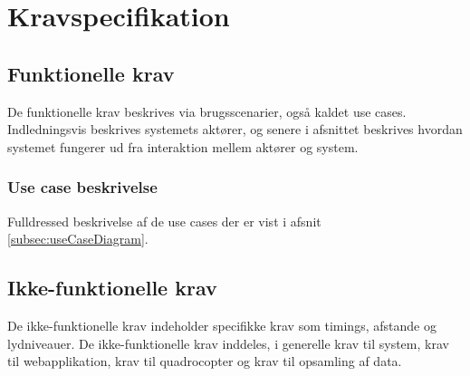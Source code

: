 \chapter{Kravspecifikation}
\label{chap:kravspec}

\section{Funktionelle krav}
\label{sec:funkKrav}
De funktionelle krav beskrives via brugsscenarier, også kaldet use cases. Indledningsvis beskrives systemets aktører, og senere i afsnittet beskrives hvordan systemet fungerer ud fra interaktion mellem aktører og system.

			



\newpage
\subsection{Use case beskrivelse}
\label{subsec:useCaseBeskrivelse}
Fulldressed beskrivelse af de use cases der er vist i afsnit \ref{subsec:useCaseDiagram}. \newline 







\newpage
\section{Ikke-funktionelle krav}
\label{sec:ikkeFunkKrav}
De ikke-funktionelle krav indeholder specifikke krav som timings, afstande og lydniveauer.
De ikke-funktionelle krav inddeles, i generelle krav til system, krav til webapplikation, krav til quadrocopter og krav til opsamling af data.\newline


